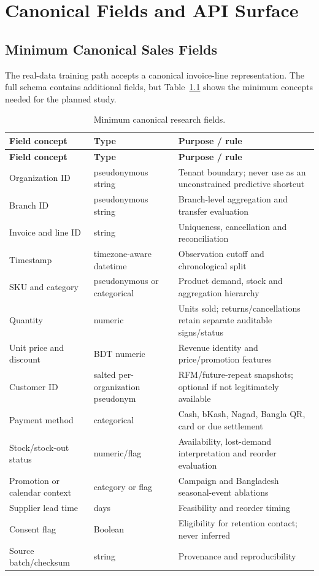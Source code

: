 \chapter{Canonical Fields and API Surface}
\label{appendix_api}

\section{Minimum Canonical Sales Fields}

The real-data training path accepts a canonical invoice-line representation. The
full schema contains additional fields, but Table~\ref{tab:canonical_fields}
shows the minimum concepts needed for the planned study.

\begin{longtable}{|p{}|p{}|p{}|}
\caption{Minimum canonical research fields.}
\label{tab:canonical_fields}\\
\hline
\textbf{Field concept} & \textbf{Type} & \textbf{Purpose / rule} \\
\hline
\endfirsthead
\hline
\textbf{Field concept} & \textbf{Type} & \textbf{Purpose / rule} \\
\hline
\endhead
Organization ID & pseudonymous string & Tenant boundary; never use as an unconstrained predictive shortcut \\
Branch ID & pseudonymous string & Branch-level aggregation and transfer evaluation \\
Invoice and line ID & string & Uniqueness, cancellation and reconciliation \\
Timestamp & timezone-aware datetime & Observation cutoff and chronological split \\
SKU and category & pseudonymous or categorical & Product demand, stock and aggregation hierarchy \\
Quantity & numeric & Units sold; returns/cancellations retain separate auditable signs/status \\
Unit price and discount & BDT numeric & Revenue identity and price/promotion features \\
Customer ID & salted per-organization pseudonym & RFM/future-repeat snapshots; optional if not legitimately available \\
Payment method & categorical & Cash, bKash, Nagad, Bangla QR, card or due settlement \\
Stock/stock-out status & numeric/flag & Availability, lost-demand interpretation and reorder evaluation \\
Promotion or calendar context & category or flag & Campaign and Bangladesh seasonal-event ablations \\
Supplier lead time & days & Feasibility and reorder timing \\
Consent flag & Boolean & Eligibility for retention contact; never inferred \\
Source batch/checksum & string & Provenance and reproducibility \\
\hline
\end{longtable}


